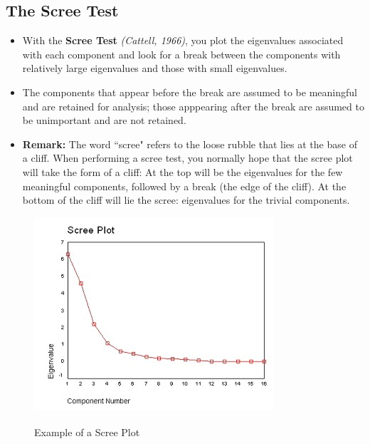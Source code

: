 \documentclass[a4paper,12pt]{article}
\begin{document}
\subsection{The Scree Test} 
\begin{itemize}
	\item With the \textbf{Scree Test} \textit{(Cattell, 1966)}, you plot the eigenvalues associated with
	each component and look for a break between the components with relatively large
	eigenvalues and those with small eigenvalues.
	
%	
	\item   The components that appear before the break are
	assumed to be meaningful and are retained for analysis; those apppearing after the break are
	assumed to be unimportant and are not retained.
	
	\item \textbf{Remark:} The word ``scree" refers to the loose rubble that lies at
	the base of a cliff.  When performing a scree test, you normally hope that the scree plot
	will take the form of a cliff:  At the top will be the eigenvalues for the few meaningful
	components, followed by a break (the edge of the cliff).  At the bottom of the cliff will lie
	the scree:  eigenvalues for the trivial components.
\end{itemize}

\begin{figure}[h!]
	\begin{center}
		\includegraphics[scale=0.9]{3AScree1.jpg}\\
		\caption{Example of a Scree Plot}\label{Scree Plot}
	\end{center}
	
\end{figure}
\end{document}
